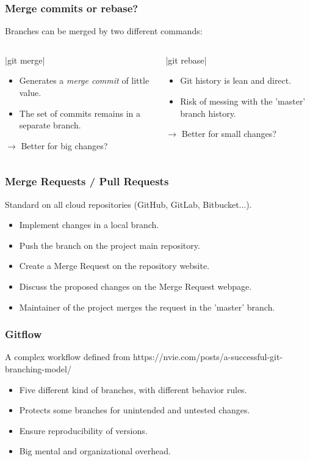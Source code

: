 \begin{frame}[fragile]
\frametitle{Merge commits or rebase?}
   Branches can be merged by two different commands:
   \begin{columns}
   \begin{column}{0.5\linewidth}
      |git merge|
      \begin{itemize}
         \item Generates a {\it merge commit} of little value.
         \item The set of commits remains in a separate branch.
      \end{itemize}
      $\rightarrow$ Better for big changes?
   \end{column}
   \begin{column}{0.5\linewidth}
      |git rebase|
      \begin{itemize}
         \item Git history is lean and direct.
         \item Risk of messing with the 'master' branch history.
      \end{itemize}
      $\rightarrow$ Better for small changes?
   \end{column}
   \end{columns}
\end{frame}

\begin{frame}
\frametitle{Merge Requests / Pull Requests}
   Standard on all cloud repositories (GitHub, GitLab, Bitbucket...).
   \begin{itemize}
      \item Implement changes in a local branch.
      \item Push the branch on the project main repository.
      \item Create a Merge Request on the repository website.
      \item Discuss the proposed changes on the Merge Request webpage.
      \item Maintainer of the project merges the request in the 'master' branch.
   \end{itemize}
\end{frame}

\begin{frame}
\frametitle{Gitflow}
   A complex workflow defined from https://nvie.com/posts/a-successful-git-branching-model/
   \begin{itemize}
      \item Five different kind of branches, with different behavior rules.
      \item Protects some branches for unintended and untested changes.
      \item Ensure reproducibility of versions.
      \item Big mental and organizational overhead.
   \end{itemize}
\end{frame}

